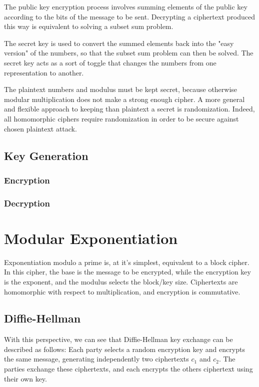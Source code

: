 \documentclass[preprint]{iacrtrans}
\begin{document}
The public key encryption process involves summing elements of the public key according to the bits of the message to be sent. Decrypting a ciphertext produced this way is equivalent to solving a subset sum problem.

The secret key is used to convert the summed elements back into the "easy version" of the numbers, so that the subset sum problem can then be solved. The secret key acts as a sort of toggle that changes the numbers from one representation to another. 

The plaintext numbers and modulus must be kept secret, because otherwise modular multiplication does not make a strong enough cipher. A more general and flexible approach to keeping than plaintext a secret is randomization. Indeed, all homomorphic ciphers require randomization in order to be secure against chosen plaintext attack. 

\subsection{Key Generation}
\subsubsection{Encryption}
\subsubsection{Decryption}

\section{Modular Exponentiation}
Exponentiation modulo a prime is, at it's simplest, equivalent to a block cipher. In this cipher, the base is the message to be encrypted, while the encryption key is the exponent, and the modulus selects the block/key size. Ciphertexts are homomorphic with respect to multiplication, and encryption is commutative.

\subsection{Diffie-Hellman}
With this perspective, we can see that Diffie-Hellman key exchange can be described as follows: Each party selects a random encryption key and encrypts the same message, generating independently two ciphertexts $c_1$ and $c_2$. The parties exchange these ciphertexts, and each encrypts the others ciphertext using their own key.
\end{document}
